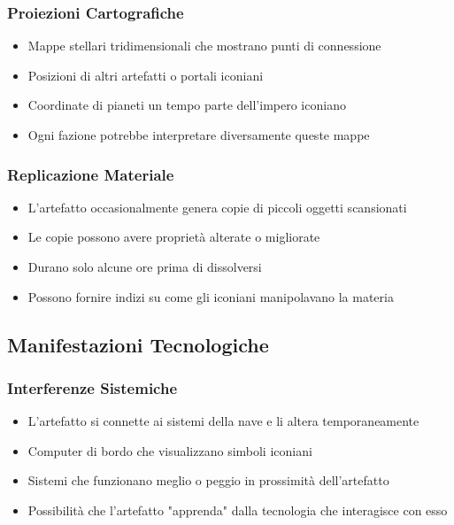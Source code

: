 \documentclass[letterpaper,twocolumn,openany,nodeprecatedcode]{dndbook}
\begin{document}
\subsubsection{Proiezioni Cartografiche}
   \begin{itemize}
       \item Mappe stellari tridimensionali che mostrano punti di connessione
       \item Posizioni di altri artefatti o portali iconiani
       \item Coordinate di pianeti un tempo parte dell'impero iconiano
       \item Ogni fazione potrebbe interpretare diversamente queste mappe
   \end{itemize}

\subsubsection{Replicazione Materiale}
   \begin{itemize}
       \item L'artefatto occasionalmente genera copie di piccoli oggetti scansionati
       \item Le copie possono avere proprietà alterate o migliorate
       \item Durano solo alcune ore prima di dissolversi
       \item Possono fornire indizi su come gli iconiani manipolavano la materia
   \end{itemize}

\subsection{Manifestazioni Tecnologiche}

\subsubsection{Interferenze Sistemiche}
   \begin{itemize}
       \item L'artefatto si connette ai sistemi della nave e li altera temporaneamente
       \item Computer di bordo che visualizzano simboli iconiani
       \item Sistemi che funzionano meglio o peggio in prossimità dell'artefatto
       \item Possibilità che l'artefatto "apprenda" dalla tecnologia che interagisce con esso
   \end{itemize}
\end{document}
